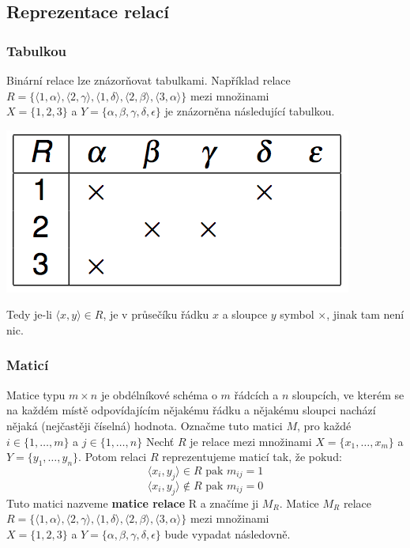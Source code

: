 \subsection{Reprezentace relací}

\subsubsection{Tabulkou}
Binární relace lze znázorňovat tabulkami. Například relace \\$R = \{ \langle 1, \alpha \rangle, \langle 2, \gamma \rangle, \langle 1, \delta \rangle, \langle 2, \beta \rangle, \langle 3, \alpha \rangle\}$ mezi množinami \\$X = \{1,2,3\}$ a $Y = \{\alpha, \beta, \gamma, \delta, \epsilon\}$ je znázorněna následující tabulkou.

\begin{center}
	\includegraphics[scale=0.5]{img/RelationTable}
\end{center}

Tedy je-li $\langle x, y \rangle \in R$, je v průsečíku řádku $x$ a sloupce $y$ symbol $\times$, jinak tam není nic.

\subsubsection{Maticí}
Matice typu $m \times n$ je obdélníkové schéma o $m$ řádcích a $n$ sloupcích, ve kterém se na každém místě odpovídajícím nějakému řádku a nějakému sloupci nachází nějaká (nejčastěji číselná) hodnota. Označme tuto matici $M$, pro každé $i \in \{1, \dots,m\}$ a $j \in \{1,\dots,n\}$  Nechť $R$ je relace mezi množinami $X = \{x_1,\dots,x_m\}$ a $Y = \{y_1, \dots, y_n\}$. Potom relaci $R$ reprezentujeme maticí tak, že pokud:
$$\langle x_i,y_j\rangle \in R \text{ pak } m_{ij} = 1$$
$$\langle x_i,y_j\rangle \not\in R \text{ pak } m_{ij} = 0$$
Tuto matici nazveme \textbf{matice relace} R a značíme ji $M_R$. Matice $M_R$ relace $R = \{ \langle 1, \alpha \rangle, \langle 2, \gamma \rangle, \langle 1, \delta \rangle, \langle 2, \beta \rangle, \langle 3, \alpha \rangle\}$ mezi množinami \\$X = \{1,2,3\}$ a $Y = \{\alpha, \beta, \gamma, \delta, \epsilon\}$ bude vypadat  následovně.

